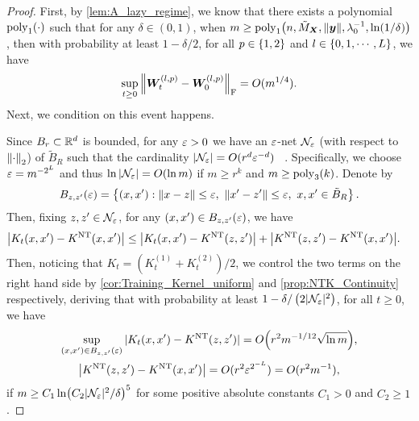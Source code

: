 \begin{proof}
  First, by \cref{lem:A_lazy_regime}, we know that there exists a polynomial $\mathrm{poly}_1(\cdot)$ such that for any $\delta\in(0,1)$, when $m\geq\poly_1\xkm{n, \tilde{M}_{\bm{X}},\norm{\bm{y}},\lambda_0^{-1},\ln(1/\delta)}$, then with probability at least $1-\delta/2$, for all $p\in\left\{1,2\right\}$ and $l\in\left\{0,1,\cdots,L\right\}$, we have
  \begin{align*}
    \sup_{t \geq 0} \norm{\bm{W}^{(l,p)}_t - \bm{W}^{(l,p)}_0}_{\mathrm{F}} = O(m^{1/4}).
  \end{align*}
  Next, we condition on this event happens.

  Since $B_r \subset \mathbb{R}^d$ is bounded, for any $\varepsilon > 0$ we have an $\varepsilon$-net $\mathcal{N}_{\varepsilon}$ (with respect to $\norm{\cdot}_2$)
  of $\tilde{B}_R$ such that the cardinality $\abs{\mathcal{N}_{\varepsilon}} = O(r^d\varepsilon^{-d})$
  ~\citep[Section 4.2]{vershynin2018_HighdimensionalProbability}.
  Specifically, we choose $\varepsilon = m^{-2^L}$ and thus $\ln \abs{\mathcal{N}_{\varepsilon}} = O(\ln m)$ if $m \geq r^k$ and $ m \geq \mathrm{poly}_3(k)$.
  Denote by
  \[B_{z,z'}(\varepsilon)=\left\{(x,x'):\norm{x-z}\leq\varepsilon,~\norm{x'-z'} \leq \varepsilon,~x,x' \in\tilde{B}_R\right\}.\]
  Then, fixing $z,z' \in \mathcal{N}_\varepsilon$, for any $(x,x') \in B_{z,z'}(\varepsilon)$, we have
  \begin{align*}
    \abs{K_t(x,x') - K^{\mathrm{NT}}(x,x')}&\leq \abs{ K_t(x,x')  - K^{\mathrm{NT}}(z,z') } + \abs{K^{\mathrm{NT}}(z,z') - K^{\mathrm{NT}}(x,x')}.
  \end{align*}
  Then, noticing that $K_t = (K_t^{(1)} + K_t^{(2)})/2$, we control the two terms on the right hand side by
  \cref{cor:Training_Kernel_uniform} and \cref{prop:NTK_Continuity} respectively,
  deriving that with probability at least $1-\delta/\left(2|\mathcal{N}_{\varepsilon}|^2\right)$, for all $t\geq 0$, we have
  \begin{align*}
    \begin{gathered}
      \sup_{(\x,\x')\in B_{\z,\z'}(\varepsilon)} |K_t(\x,\x') - \NTK(\z,\z')| = O\xkm{r^2 m^{-1/12}\sqrt{\ln m}}, \\
      \abs{\NTK(\z,\z') - \NTK(\x,\x')} = O(r^2\ep^{2^{-L}}) = O(r^2m^{-1}),
    \end{gathered}
  \end{align*}
  if $m\geq C_1\ln\xkm{C_2|\mathcal{N}_{\varepsilon}|^2/\delta}^5$ for some positive absolute constants $C_1>0$ and $C_2\geq 1$.
  

\end{proof}
